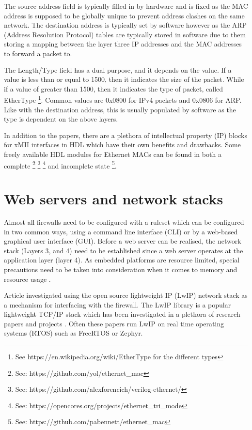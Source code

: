 The source address field is typically filled in by hardware and is fixed as the MAC address is supposed to be globally unique to prevent address clashes on the same network. The destination address is typically set by software however as the ARP (Address Resolution Protocol) tables are typically stored in software due to them storing a mapping between the layer three IP addresses and the MAC addresses to forward a packet to. 

The Length/Type field has a dual purpose, and it depends on the value. If a value is less than or equal to 1500, then it indicates the size of the packet. While if a value of greater than 1500, then it indicates the type of packet, called EtherType \footnote[1]{See https://en.wikipedia.org/wiki/EtherType for the different types}. Common values are 0x0800 for IPv4 packets and 0x0806 for ARP. Like with the destination address, this is usually populated by software as the type is dependent on the above layers.


In addition to the papers, there are a plethora of intellectual property (IP) blocks for xMII interfaces in HDL 
which have their own benefits and drawbacks. Some freely available HDL modules for Ethernet MACs can be found in both a complete \footnote[2]{See: https://github.com/yol/ethernet\_mac} \footnote[3]{See: https://github.com/alexforencich/verilog-ethernet/} 
\footnote[4]{See: https://opencores.org/projects/ethernet\_tri\_mode} and incomplete state
\footnote[5]{See: https://github.com/pabennett/ethernet\_mac}.








\section{Web servers and network stacks}

Almost all firewalls need to be configured with a ruleset which can be configured in two common ways, using a command line interface (CLI) 
or by a web-based graphical user interface (GUI). Before a web server can be realised, the network stack (Layers 3, and 4) need to be established since a web server 
operates at the application layer (layer 4). As embedded platforms are resource limited, special precautions need to be taken into consideration when it comes to memory and resource 
usage \cite{OptimCortexLwIP}.

Article \cite{LwIPFPGAFirewall} investigated using the open source lightweight IP (LwIP) network stack as a mechanism for interfacing with the firewall. 
The LwIP library is a popular lightweight TCP/IP stack which has been investigated in a plethora of research papers and projects \cite{ImprovemntOptimLWIP} 
\cite{OptimCortexLwIP}. Often these papers run LwIP on real time operating systems (RTOS) such as FreeRTOS or Zephyr.

